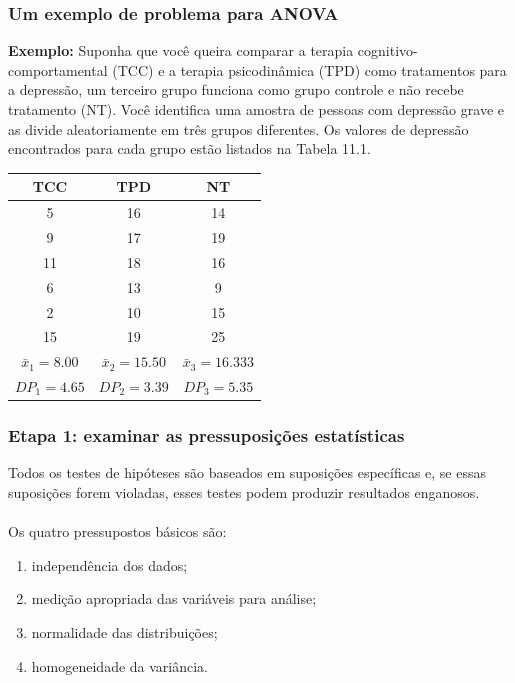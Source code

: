 \documentclass[11pt]{beamer}
\begin{document}
\begin{frame}
\frametitle{Um exemplo de problema para ANOVA}

\textbf{Exemplo:} Suponha que você queira comparar a terapia cognitivo-comportamental (TCC) e a terapia psicodinâmica (TPD) como tratamentos para a depressão, um terceiro grupo funciona como grupo controle e não recebe tratamento (NT). Você identifica uma amostra de pessoas com depressão grave e as divide aleatoriamente em três grupos diferentes. Os valores de depressão encontrados para cada grupo estão listados na Tabela 11.1. 

\begin{center}
\begin{tabular}{ ccc } 
 \hline
TCC & TPD & NT\\
\hline
 5 & 16 & 14\\
 9 & 17 & 19\\
 11 & 18 & 16\\
 6 & 13 & 9\\
 2 & 10 & 15\\
 15 & 19 & 25\\
 $\bar{x}_1 = 8.00$ & $\bar{x}_2 = 15.50$ & $\bar{x}_3 = 16.333$\\
 $DP_1 = 4.65$ & $DP_2 = 3.39$ & $DP_3 = 5.35$\\
 \hline
\end{tabular}
\end{center}
\end{frame}

\begin{frame}
\frametitle{Etapa 1: examinar as pressuposições estatísticas}

Todos os testes de hipóteses são baseados em suposições específicas e, se essas suposições forem violadas, esses testes podem produzir resultados enganosos.\\~\\
Os quatro pressupostos básicos são:

\begin{enumerate}
\item independência dos dados;
\item medição apropriada das variáveis para análise;
\item normalidade das distribuições;
\item homogeneidade da variância.
\end{enumerate}

\end{frame}
\end{document}
